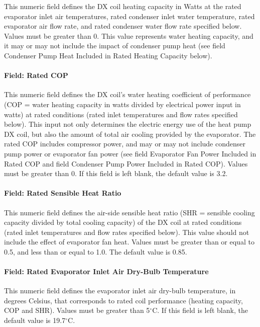 This numeric field defines the DX coil heating capacity in Watts at the rated evaporator inlet air temperatures, rated condenser inlet water temperature, rated evaporator air flow rate, and rated condenser water flow rate specified below. Values must be greater than 0. This value represents water heating capacity, and it may or may not include the impact of condenser pump heat (see field Condenser Pump Heat Included in Rated Heating Capacity below).

\paragraph{Field: Rated COP}\label{field-rated-cop-1}

This numeric field defines the DX coil's water heating coefficient of performance (COP = water heating capacity in watts divided by electrical power input in watts) at rated conditions (rated inlet temperatures and flow rates specified below). This input not only determines the electric energy use of the heat pump DX coil, but also the amount of total air cooling provided by the evaporator. The rated COP includes compressor power, and may or may not include condenser pump power or evaporator fan power (see field Evaporator Fan Power Included in Rated COP and field Condenser Pump Power Included in Rated COP). Values must be greater than 0. If this field is left blank, the default value is 3.2.

\paragraph{Field: Rated Sensible Heat Ratio}\label{field-rated-sensible-heat-ratio-2}

This numeric field defines the air-side sensible heat ratio (SHR = sensible cooling capacity divided by total cooling capacity) of the DX coil at rated conditions (rated inlet temperatures and flow rates specified below). This value should not include the effect of evaporator fan heat. Values must be greater than or equal to 0.5, and less than or equal to 1.0. The default value is 0.85.

\paragraph{Field: Rated Evaporator Inlet Air Dry-Bulb Temperature}\label{field-rated-evaporator-inlet-air-dry-bulb-temperature-1}

This numeric field defines the evaporator inlet air dry-bulb temperature, in degrees Celsius, that corresponds to rated coil performance (heating capacity, COP and SHR). Values must be greater than 5$^\circ$C. If this field is left blank, the default value is 19.7$^\circ$C.

